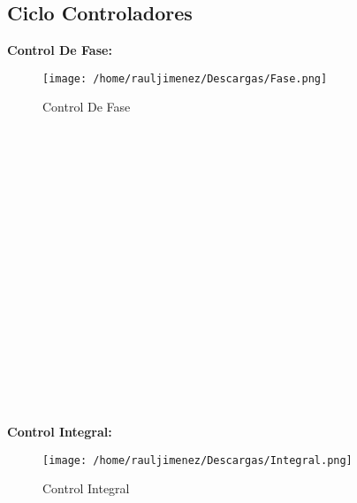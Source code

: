 \documentclass[11pt]{article}
\begin{document}
\subsection{Ciclo Controladores}
\textbf{Control De Fase:}\\
\begin{figure}[htp]
\centering
\texttt{[image: /home/rauljimenez/Descargas/Fase.png]}
\caption{Control De Fase}
\label{}
\end{figure}\\\\\\\\\\\\\\\\\\\\\\\\\\\\\\\\\\
\textbf{Control Integral:}\\
\begin{figure}[htp]
\centering
\texttt{[image: /home/rauljimenez/Descargas/Integral.png]}
\caption{Control Integral}
\label{}
\end{figure}\\\\\\\\\\\\\\\\\\\\\\\\\\\\\\
\end{document}
